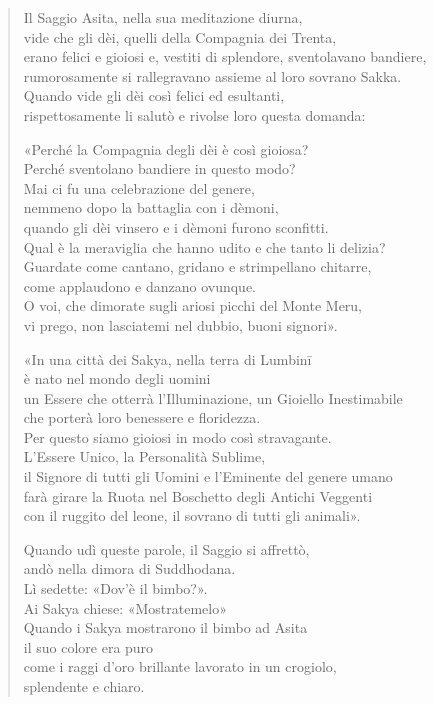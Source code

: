 \begin{quote}
Il Saggio Asita, nella sua meditazione diurna, \\
vide che gli dèi, quelli della Compagnia dei Trenta, \\
erano felici e gioiosi e, vestiti di splendore, sventolavano bandiere, \\
rumorosamente si rallegravano assieme al loro sovrano Sakka. \\
Quando vide gli dèi così felici ed esultanti, \\
rispettosamente li salutò e rivolse loro questa domanda:

«Perché la Compagnia degli dèi è così gioiosa? \\
Perché sventolano bandiere in questo modo? \\
Mai ci fu una celebrazione del genere, \\
nemmeno dopo la battaglia con i dèmoni, \\
quando gli dèi vinsero e i dèmoni furono sconfitti. \\
Qual è la meraviglia che hanno udito e che tanto li delizia? \\
Guardate come cantano, gridano e strimpellano chitarre, \\
come applaudono e danzano ovunque. \\
O voi, che dimorate sugli ariosi picchi del Monte Meru, \\
vi prego, non lasciatemi nel dubbio, buoni signori».

«In una città dei Sakya, nella terra di Lumbinī \\
è nato nel mondo degli uomini \\
un Essere che otterrà l’Illuminazione, un Gioiello Inestimabile \\
che porterà loro benessere e floridezza. \\
Per questo siamo gioiosi in modo così stravagante. \\
L’Essere Unico, la Personalità Sublime, \\
il Signore di tutti gli Uomini e l’Eminente del genere umano \\
farà girare la Ruota nel Boschetto degli Antichi Veggenti \\
con il ruggito del leone, il sovrano di tutti gli animali».

Quando udì queste parole, il Saggio si affrettò, \\
andò nella dimora di Suddhodana. \\
Lì sedette: «Dov’è il bimbo?». \\
Ai Sakya chiese: «Mostratemelo» \\
Quando i Sakya mostrarono il bimbo ad Asita \\
il suo colore era puro \\
come i raggi d’oro brillante lavorato in un crogiolo, \\
splendente e chiaro.


\end{quote}
